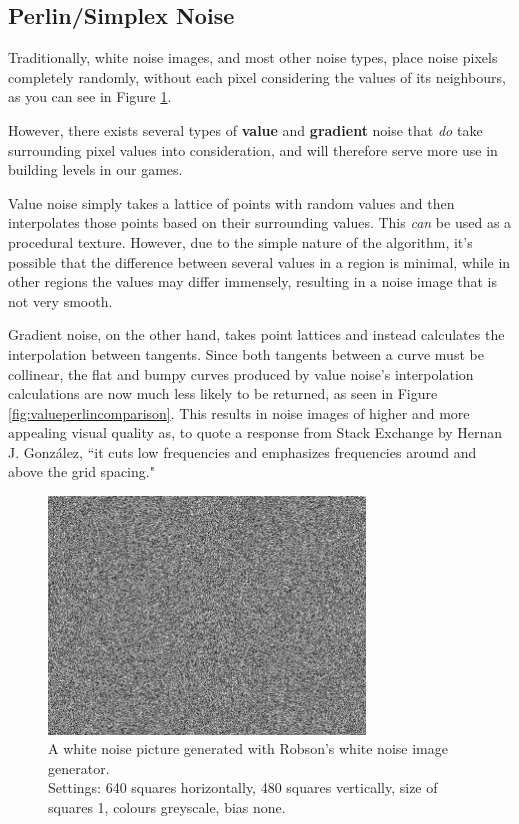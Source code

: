 \subsection{Perlin/Simplex Noise}

Traditionally, white noise images, and most other noise types, place noise pixels completely randomly, without each pixel considering the values of its neighbours\cite{gd3perlinnoise}, as you can see in Figure \ref{fig:whitenoisepic}.

However, there exists several types of \textbf{value} and \textbf{gradient} noise that \textit{do} take surrounding pixel values into consideration, and will therefore serve more use in building levels in our games.

Value noise simply takes a lattice of points with random values and then interpolates those points based on their surrounding values. This \textit{can} be used as a procedural texture. However, due to the simple nature of the algorithm, it's possible that the difference between several values in a region is minimal, while in other regions the values may differ immensely, resulting in a noise image that is not very smooth.

Gradient noise, on the other hand, takes point lattices and instead calculates the interpolation between tangents.\cite{perlinvalue} Since both tangents between a curve must be collinear\cite{perlinvalue}, the flat and bumpy curves produced by value noise's interpolation calculations are now much less likely to be returned, as seen in Figure \ref{fig:valueperlincomparison}.\cite{perlinvalue} This results in noise images of higher and more appealing visual quality as, to quote a response from Stack Exchange by Hernan J. González\cite{gradientvalue}, ``it cuts low frequencies and emphasizes frequencies around and above the grid spacing."

\begin{figure}[H]
    \centering
    \includegraphics[width=0.75\textwidth]{Images/whitenoisepic.png}
    \caption{A white noise picture generated with Robson's white noise image generator.\cite{whitenoisepicgen}\\Settings: 640 squares horizontally, 480 squares vertically, size of squares 1, colours greyscale, bias none.}
    \label{fig:whitenoisepic}
\end{figure}


